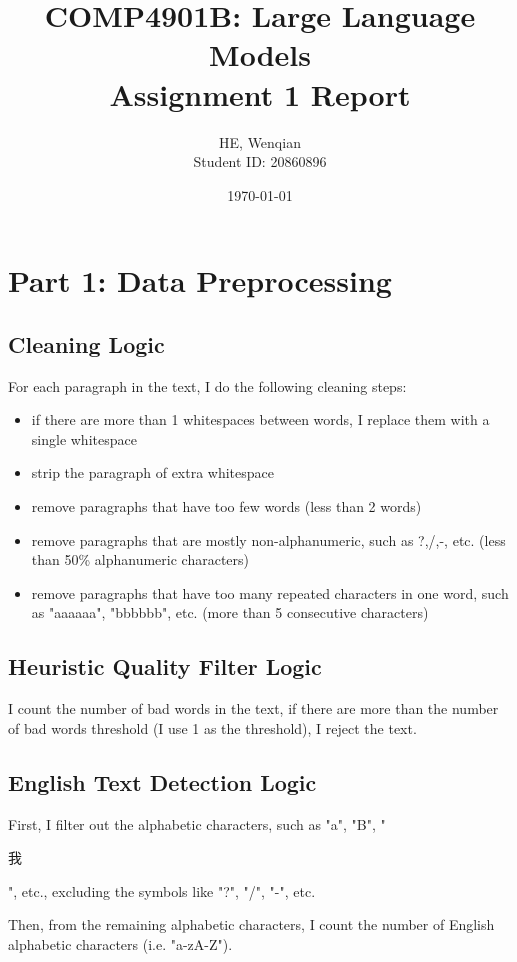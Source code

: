\documentclass[11pt,a4paper]{article}
\title{
    \textbf{COMP4901B: Large Language Models} \\
    \vspace{0.5em}
    \Large Assignment 1 Report
}
\author{HE, Wenqian \\ Student ID: 20860896}
\date{\today}
\begin{document}
\maketitle


\section{Part 1: Data Preprocessing}

\subsection{Cleaning Logic}

For each paragraph in the text, I do the following cleaning steps:
\begin{itemize}
    \item if there are more than 1 whitespaces between words, I replace them with a single whitespace
    \item strip the paragraph of extra whitespace
    \item remove paragraphs that have too few words (less than 2 words)
    \item remove paragraphs that are mostly non-alphanumeric, such as ?,/,-, etc. (less than 50\% alphanumeric characters)
    \item remove paragraphs that have too many repeated characters in one word, such as "aaaaaa", "bbbbbb", etc. (more than 5 consecutive characters)
\end{itemize}

\subsection{Heuristic Quality Filter Logic}

I count the number of bad words in the text, if there are more than the number of bad words threshold (I use 1 as the threshold), I reject the text.

\subsection{English Text Detection Logic}

First, I filter out the alphabetic characters, such as "a", "B", "\begin{CJK}{UTF8}{gbsn}我\end{CJK}", etc., excluding the symbols like "?", "/", "-", etc.

Then, from the remaining alphabetic characters, I count the number of English alphabetic characters (i.e. "a-zA-Z").
\end{document}
